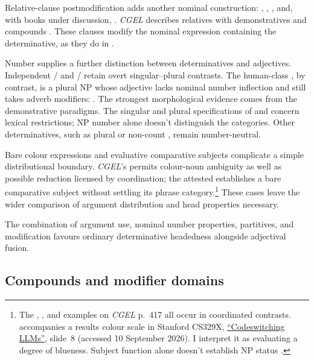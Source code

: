 \documentclass[12pt]{article}
\begin{document}
Relative-clause postmodification adds another nominal construction: , , , and, with books under discussion, . \textit{CGEL} describes relatives with demonstratives and compounds \citep[414, 422--423]{huddleston2002}. These clauses modify the nominal expression containing the determinative, as they do in .

Number supplies a further distinction between determinatives and adjectives. Independent /\allowbreak{} and /\allowbreak{} retain overt singular--plural contrasts. The human-class , by contrast, is a plural NP whose adjective lacks nominal number inflection and still takes adverb modifiers:  \citep[418]{huddleston2002}. The strongest morphological evidence comes from the demonstrative paradigms. The singular and plural specifications of  and  concern lexical restrictions; NP number alone doesn't distinguish the categories. Other determinatives, such as plural or non-count , remain number-neutral.

Bare colour expressions and evaluative comparative subjects complicate a simple distributional boundary. \textit{CGEL}'s  permits colour-noun ambiguity as well as possible reduction licensed by coordination; the attested  establishes a bare comparative subject without settling its phrase category.\footnote{The , , and  examples on \textit{CGEL} p.~417 all occur in coordinated contrasts.  accompanies a results colour scale in Stanford CS329X, \href{https://web.stanford.edu/class/cs329x/slides/Lecture12_B_Codeswitching\%20LLMs.pdf}{\enquote{Codeswitching LLMs}}, slide~8 (accessed 10 September 2026). I interpret it as evaluating a degree of blueness. Subject function alone doesn't establish NP status \citep[236]{huddleston2002}.} These cases leave the wider comparison of argument distribution and head properties necessary.

The combination of argument use, nominal number properties, partitives, and modification favours ordinary determinative headedness alongside adjectival fusion.

\subsection{Compounds and modifier domains}\label{sec:compounds}
\end{document}
